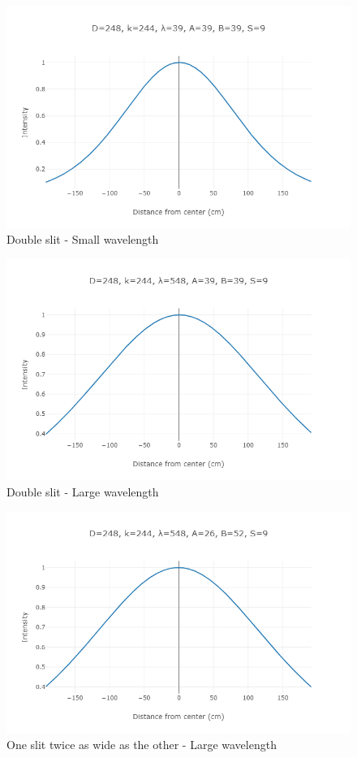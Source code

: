 \documentclass{paper}
\begin{document}
\begin{appendices}
\begin{figure}[H]
    \caption{Double slit - Small wavelength}
    \includegraphics{diagrams/diffraction/double-slit-small-lambda.png}
\end{figure}

\begin{figure}[H]
    \caption{Double slit - Large wavelength}
    \includegraphics{diagrams/diffraction/double-slit-large-lambda.png}
\end{figure}

\begin{figure}[H]
    \caption{One slit twice as wide as the other - Large wavelength}
    \includegraphics{diagrams/diffraction/1-2-ratio-large-lambda.png}
\end{figure}

\pagebreak

\end{appendices}
\end{document}
